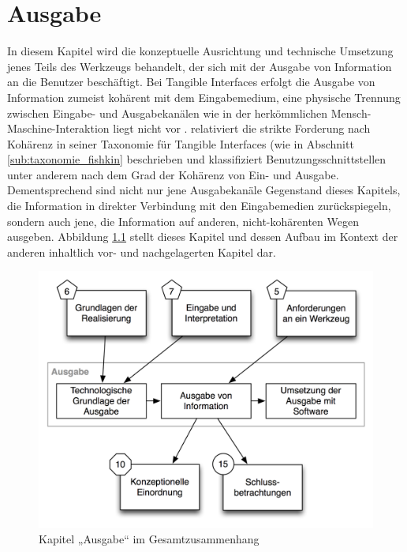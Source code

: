 
\chapter{Ausgabe} %
\label{cha:visualisierung}

In diesem Kapitel wird die konzeptuelle Ausrichtung und technische Umsetzung jenes Teils des Werkzeugs behandelt, der sich mit der Ausgabe von Information an die Benutzer beschäftigt. Bei Tangible Interfaces erfolgt die Ausgabe von Information zumeist kohärent mit dem Eingabemedium, eine physische Trennung zwischen Eingabe- und Ausgabekanälen wie in der herkömmlichen Mensch-Maschine-Interaktion liegt nicht vor \citep{Ullmer00}. \citet{Fishkin04} relativiert die strikte Forderung nach Kohärenz in seiner Taxonomie für Tangible Interfaces (wie in Abschnitt \ref{sub:taxonomie_fishkin} beschrieben und klassifiziert Benutzungsschnittstellen unter anderem nach dem Grad der Kohärenz von Ein- und Ausgabe. Dementsprechend sind nicht nur jene Ausgabekanäle Gegenstand dieses Kapitels, die Information in direkter Verbindung mit den Eingabemedien zurückspiegeln, sondern auch jene, die Information auf anderen, nicht-kohärenten Wegen ausgeben. Abbildung \ref{fig:img_Kontextgrafiken_k8} stellt dieses Kapitel und dessen Aufbau im Kontext der anderen inhaltlich vor- und nachgelagerten Kapitel dar.

\begin{figure}[htbp]
	\centering
		\includegraphics[scale=0.6]{img/Kontextgrafiken/k8.png}
	\caption{Kapitel „Ausgabe“ im Gesamtzusammenhang}
	\label{fig:img_Kontextgrafiken_k8}
\end{figure}

